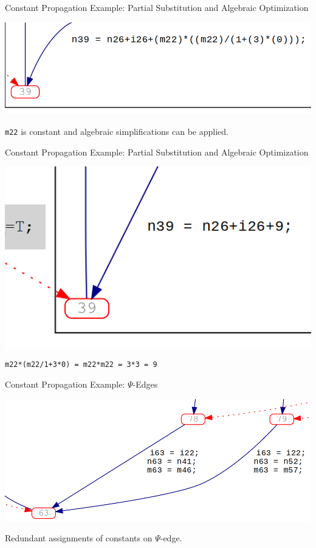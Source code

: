 \documentclass[xcolor={usenames,dvipsnames}, aspectratio=169, 12pt]{beamer}
\begin{document}
\begin{frame}{Constant Propagation}
	Example: Partial Substitution and Algebraic Optimization

	\includegraphics[width=\linewidth]{images/constfolding/example1a.png}

	\texttt{m22} is constant and algebraic simplifications can be applied.
\end{frame}

\begin{frame}{Constant Propagation}
	Example: Partial Substitution and Algebraic Optimization

	\includegraphics[width=\linewidth]{images/constfolding/example1b.png}

	\texttt{m22*(m22/1+3*0) = m22*m22 = 3*3 = 9}
\end{frame}

\begin{frame}{Constant Propagation}
	Example: $\Psi$-Edges

	\includegraphics[width=\linewidth]{images/constfolding/example2a.png}

	Redundant assignments of constants on $\Psi$-edge.
\end{frame}
\end{document}
